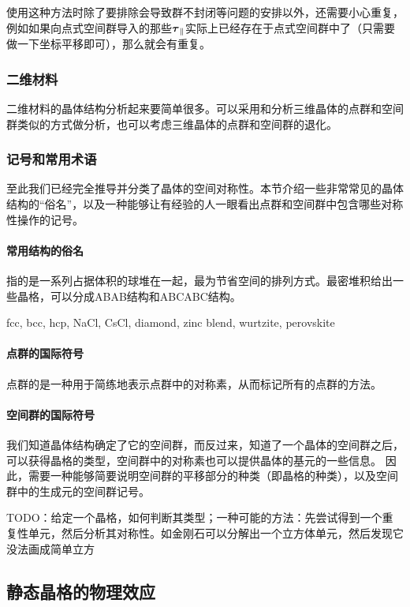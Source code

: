 使用这种方法时除了要排除会导致群不封闭等问题的安排以外，还需要小心重复，例如如果向点式空间群导入的那些$\vb*{\tau}_\parallel$实际上已经存在于点式空间群中了（只需要做一下坐标平移即可），那么就会有重复。

\subsubsection{二维材料}

二维材料的晶体结构分析起来要简单很多。可以采用和分析三维晶体的点群和空间群类似的方式做分析，也可以考虑三维晶体的点群和空间群的退化。

\subsubsection{记号和常用术语}

至此我们已经完全推导并分类了晶体的空间对称性。本节介绍一些非常常见的晶体结构的“俗名”，以及一种能够让有经验的人一眼看出点群和空间群中包含哪些对称性操作的记号。

\paragraph{常用结构的俗名} 指的是一系列占据体积的球堆在一起，最为节省空间的排列方式。最密堆积给出一些晶格，可以分成ABAB结构和ABCABC结构。

fcc, bcc, hcp, NaCl, CsCl, diamond, zinc blend, wurtzite, perovskite

\paragraph{点群的国际符号} 点群的是一种用于简练地表示点群中的对称素，从而标记所有的点群的方法。


\paragraph{空间群的国际符号} 我们知道晶体结构确定了它的空间群，而反过来，知道了一个晶体的空间群之后，可以获得晶格的类型，空间群中的对称素也可以提供晶体的基元的一些信息。
因此，需要一种能够简要说明空间群的平移部分的种类（即晶格的种类），以及空间群中的生成元的空间群记号。

TODO：给定一个晶格，如何判断其类型；一种可能的方法：先尝试得到一个重复性单元，然后分析其对称性。如金刚石可以分解出一个立方体单元，然后发现它没法画成简单立方


\subsection{静态晶格的物理效应}

